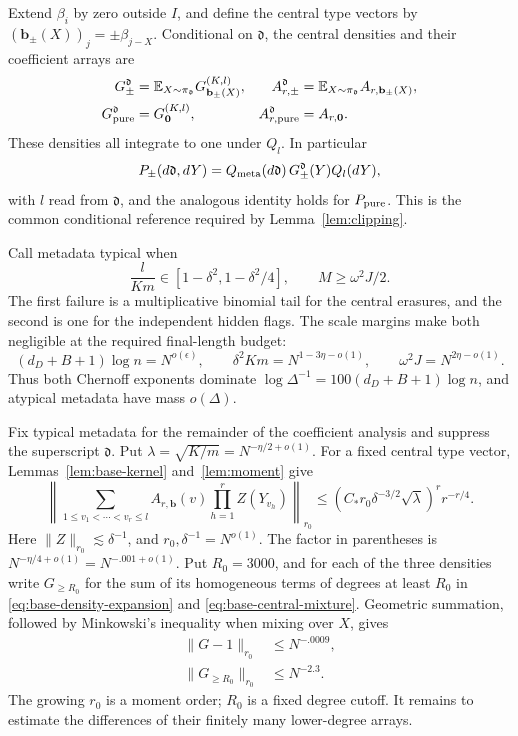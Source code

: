 Extend \(\beta_i\) by zero outside \(I\), and define the central type vectors by
\((\mathbf b_\pm(X))_j=\pm\beta_{j-X}\). Conditional on \(\mathfrak d\), the central densities and their coefficient arrays are
\begin{equation}\label{eq:base-central-mixture}
\begin{aligned}
 G_\pm^{\mathfrak d}
   &=\mathbb E_{X\sim\pi_{\mathfrak d}}G_{\mathbf b_\pm(X)}^{(K,l)},
 &A_{r,\pm}^{\mathfrak d}
   &=\mathbb E_{X\sim\pi_{\mathfrak d}}A_{r,\mathbf b_\pm(X)},\\
 G_{\rm pure}^{\mathfrak d}&=G_{\mathbf0}^{(K,l)},
 &A_{r,\rm pure}^{\mathfrak d}&=A_{r,\mathbf0}.
\end{aligned}
\end{equation}
These densities all integrate to one under \(Q_l\). In particular
\[
 P_\pm(d\mathfrak d,dY)
 =Q_{\rm meta}(d\mathfrak d)\,
       G_\pm^{\mathfrak d}(Y)Q_l(dY),
\]
with \(l\) read from \(\mathfrak d\), and the analogous identity holds for \(P_{\rm pure}\). This is the common conditional reference required by Lemma~\ref{lem:clipping}.

Call metadata typical when
\[
 \frac l{Km}\in[1-\delta^2,1-\delta^2/4],
 \qquad M\ge\omega^2J/2.
\]
The first failure is a multiplicative binomial tail for the central erasures, and the second is one for the independent hidden flags. The scale margins make both negligible at the required final-length budget:
\[
 (d_D+B+1)\log n=N^{o(\epsilon)},\qquad
 \delta^2Km=N^{1-3\eta-o(1)},\qquad
 \omega^2J=N^{2\eta-o(1)}.
\]
Thus both Chernoff exponents dominate
\(\log\Delta^{-1}=100(d_D+B+1)\log n\), and atypical metadata have mass \(o(\Delta)\).

Fix typical metadata for the remainder of the coefficient analysis and suppress the superscript \(\mathfrak d\). Put
\(\lambda=\sqrt{K/m}=N^{-\eta/2+o(1)}\).
For a fixed central type vector, Lemmas~\ref{lem:base-kernel} and~\ref{lem:moment} give
\[
 \left\|\sum_{1\le v_1<\cdots<v_r\le l}
      A_{r,\mathbf b}(v)\prod_{h=1}^r Z(Y_{v_h})\right\|_{r_0}
 \le \left(C_*r_0\delta^{-3/2}\sqrt\lambda\right)^r r^{-r/4}.
\]
Here \(\|Z\|_{r_0}\lesssim\delta^{-1}\), and
\(r_0,\delta^{-1}=N^{o(1)}\). The factor in parentheses is
\(N^{-\eta/4+o(1)}=N^{-.001+o(1)}\). Put \(R_0=3000\), and for each of the three densities write \(G_{\ge R_0}\) for the sum of its homogeneous terms of degrees at least \(R_0\) in \eqref{eq:base-density-expansion} and \eqref{eq:base-central-mixture}. Geometric summation, followed by Minkowski's inequality when mixing over \(X\), gives
\begin{equation}\label{eq:base-high-degrees}
\begin{aligned}
 \|G-1\|_{r_0}&\le N^{-.0009},\\
 \|G_{\ge R_0}\|_{r_0}&\le N^{-2.3}.
\end{aligned}
\end{equation}
The growing \(r_0\) is a moment order; \(R_0\) is a fixed degree cutoff. It remains to estimate the differences of their finitely many lower-degree arrays.

